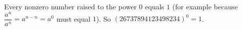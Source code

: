 Every nonzero number raised to the power $0$ equals $1$ (for example because $\dfrac{a^n}{a^n}=a^{n-n}=a^0$ must equal $1$). So $(26737894123498234)^0=\boxed{1}$.
